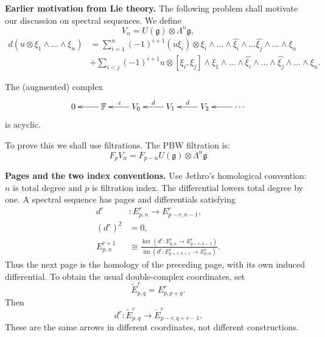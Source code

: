 \noindent
{\bf Earlier motivation from Lie theory.}
The following problem shall motivate
our discussion on spectral sequences.
We define
$$
V_n
=
U(\mathfrak{g}) \otimes
\Lambda^n\mathfrak{g},
$$
\begin{equation}
\label{equation-differential-spectral}
\begin{aligned}
d(u \otimes \xi_1 \wedge \dots \wedge
\xi_n)&=
\sum_{i=1}^n(-1)^{i+1}
(u\xi_i) \otimes \xi_i
\wedge\dots\wedge \widehat{\xi_i}
\wedge\dots \widehat{\xi_j}\wedge
\dots\wedge\xi_n\\
&+\sum_{i<j}(-1)^{i+1}
u \otimes[\xi_i,\xi_j]
\wedge\xi_1\wedge\dots\wedge
\widehat{\xi_i}\wedge\dots\wedge
\widehat{\xi_j}\wedge\dots\wedge\xi_n.
\end{aligned}
\end{equation}


\begin{lemma}
\label{lemma-chevalley-eilenberg-acyclic}
The (augmented) complex
$$
\xymatrix{
0&\ar[l]\mathbb{F}&
\ar[l]_{\varepsilon}V_0
&\ar[l]_{d}V_1
&\ar[l]_d V_2&
\ar[l]\cdots
}
$$
is acyclic.
\end{lemma}

\noindent
To prove this we shall use filtrations.
The PBW filtration is:
$$
F_pV_n
=F_{p-n}U(\mathfrak{g})\otimes
\Lambda^n\mathfrak{g}
$$

\medskip\noindent
{\bf Pages and the two index conventions.}
Use Jethro's homological convention:
$n$ is total degree and $p$ is filtration
index. The differential lowers total
 degree by one. A spectral sequence has
pages and differentials satisfying
$$
\begin{aligned}
d^r &: E^r_{p,n}\longrightarrow
E^r_{p-r,n-1},\\
(d^r)^2&=0,\\
E^{r+1}_{p,n}&\cong
\frac{\ker(d^r:E^r_{p,n}\to
E^r_{p-r,n-1})}
{\operatorname{im}(d^r:E^r_{p+r,n+1}
\to E^r_{p,n})}.
\end{aligned}
$$
Thus the next page is the homology of
the preceding page, with its own
induced differential. To obtain the
usual double-complex coordinates, set
$$
\widetilde E^r_{p,q}=E^r_{p,p+q}.
$$
Then
$$
d^r:\widetilde E^r_{p,q}
\longrightarrow
\widetilde E^r_{p-r,q+r-1}.
$$
These are the same arrows in different
coordinates, not different constructions.

